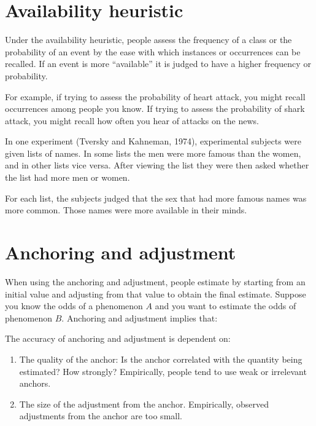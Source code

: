 \documentclass[
  letterpaper,
  DIV=11,
  numbers=noendperiod]{scrreprt}
\begin{document}
\hypertarget{availability-heuristic}{%
\section{Availability heuristic}\label{availability-heuristic}}

Under the availability heuristic, people assess the frequency of a class
or the probability of an event by the ease with which instances or
occurrences can be recalled. If an event is more ``available'' it is
judged to have a higher frequency or probability.

For example, if trying to assess the probability of heart attack, you
might recall occurrences among people you know. If trying to assess the
probability of shark attack, you might recall how often you hear of
attacks on the news.

In one experiment (Tversky and Kahneman, 1974), experimental subjects
were given lists of names. In some lists the men were more famous than
the women, and in other lists vice versa. After viewing the list they
were then asked whether the list had more men or women.

For each list, the subjects judged that the sex that had more famous
names was more common. Those names were more available in their minds.

\hypertarget{anchoring-and-adjustment}{%
\section{Anchoring and adjustment}\label{anchoring-and-adjustment}}

When using the anchoring and adjustment, people estimate by starting
from an initial value and adjusting from that value to obtain the final
estimate. Suppose you know the odds of a phenomenon \(A\) and you want
to estimate the odds of phenomenon \(B\). Anchoring and adjustment
implies that:

The accuracy of anchoring and adjustment is dependent on:

\begin{enumerate}
\def\labelenumi{\arabic{enumi}.}
\item
  The quality of the anchor: Is the anchor correlated with the quantity
  being estimated? How strongly? Empirically, people tend to use weak or
  irrelevant anchors.
\item
  The size of the adjustment from the anchor. Empirically, observed
  adjustments from the anchor are too small.
\end{enumerate}
\end{document}

